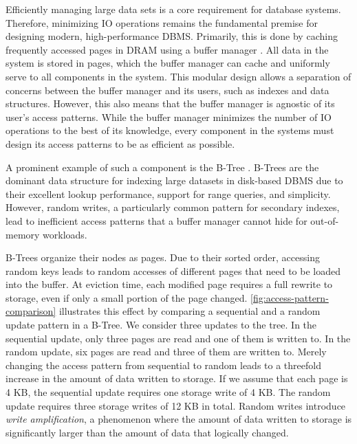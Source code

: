 Efficiently managing large data sets is a core requirement for database systems. 
Therefore, minimizing \ac{IO} operations remains the fundamental premise for designing modern, high-performance \ac{DBMS}.
Primarily, this is done by caching frequently accessed pages in \ac{DRAM} using a buffer manager \cite{leis2018leanstore}.
All data in the system is stored in pages, which the buffer manager can cache and uniformly serve to all components in the system.
This modular design allows a separation of concerns between the buffer manager and its users, such as indexes and data structures.
However, this also means that the buffer manager is agnostic of its user's access patterns.
While the buffer manager minimizes the number of \ac{IO} operations to the best of its knowledge, every component in the systems must design its access patterns to be as efficient as possible. 

A prominent example of such a component is the B-Tree \cite{bayer1970organization}.
B-Trees are the dominant data structure for indexing large datasets in disk-based \ac{DBMS} due to their excellent lookup performance, support for range queries, and simplicity.
However, random writes, a particularly common pattern for secondary indexes, lead to inefficient access patterns that a buffer manager cannot hide for out-of-memory workloads.

B-Trees organize their nodes as pages. Due to their sorted order, accessing random keys leads to random accesses of different pages that need to be loaded into the buffer.
At eviction time, each modified page requires a full rewrite to storage, even if only a small portion of the page changed.
\autoref{fig:access-pattern-comparison} illustrates this effect by comparing a sequential and a random update pattern in a B-Tree.
We consider three updates to the tree.
In the sequential update, only three pages are read and one of them is written to.
In the random update, six pages are read and three of them are written to.
Merely changing the access pattern from sequential to random leads to a threefold increase in the amount of data written to storage.
If we assume that each page is 4 KB, the sequential update requires one storage write of 4 KB.
The random update requires three storage writes of 12 KB in total.
Random writes introduce \emph{write amplification}, a phenomenon where the amount of data written to storage is significantly larger than the amount of data that logically changed.

